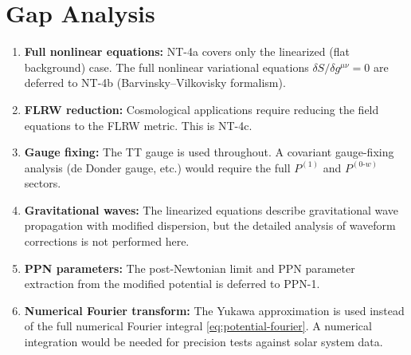 \documentclass[12pt,a4paper]{article}
\theoremstyle{definition}
\theoremstyle{remark}
\begin{document}
\section{Gap Analysis}
\label{sec:gaps}

\begin{enumerate}[label=\textbf{G\arabic*.}]
\item \textbf{Full nonlinear equations:}
  NT-4a covers only the linearized (flat background) case.
  The full nonlinear variational equations
  $\delta S/\delta g^{\mu\nu} = 0$ are deferred to NT-4b
  (Barvinsky--Vilkovisky formalism).

\item \textbf{FLRW reduction:}
  Cosmological applications require reducing the field equations
  to the FLRW metric.  This is NT-4c.

\item \textbf{Gauge fixing:}
  The TT gauge is used throughout.  A covariant gauge-fixing
  analysis (de Donder gauge, etc.) would require the full
  $P^{(1)}$ and $P^{(0\text{-}w)}$ sectors.

\item \textbf{Gravitational waves:}
  The linearized equations describe gravitational wave
  propagation with modified dispersion, but the detailed
  analysis of waveform corrections is not performed here.

\item \textbf{PPN parameters:}
  The post-Newtonian limit and PPN parameter extraction
  from the modified potential is deferred to PPN-1.

\item \textbf{Numerical Fourier transform:}
  The Yukawa approximation is used instead of the full numerical
  Fourier integral \eqref{eq:potential-fourier}.  A numerical
  integration would be needed for precision tests against
  solar system data.
\end{enumerate}
\end{document}
